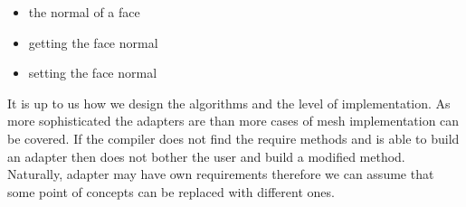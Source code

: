 \begin{itemize}
\item the normal of a face
\item getting the face normal
\item setting the face normal
\end{itemize}
It is up to us how we design the algorithms and the level of implementation. As more sophisticated
the adapters are than more cases of mesh implementation can be covered. If the compiler does not
find the require methods and is able to build an adapter then does not bother the user and build
a modified method. Naturally, adapter may have own requirements therefore we can assume that
some point of concepts can be replaced with different ones.